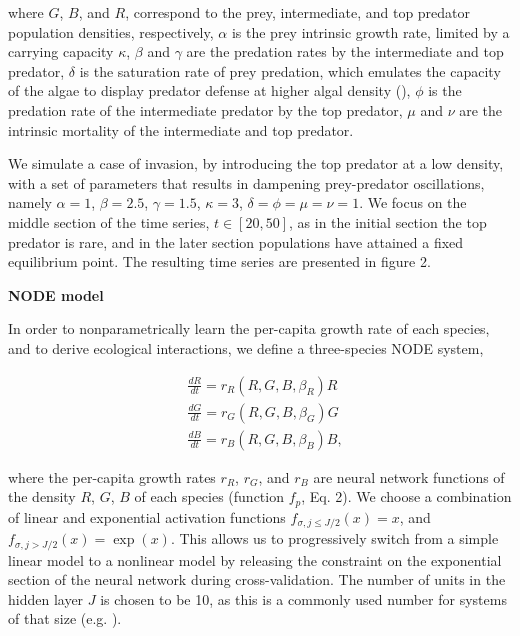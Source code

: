 \documentclass[11pt, oneside]{article}
\begin{document}
where $G$, $B$, and $R$, correspond to the prey, intermediate, and top predator population densities, respectively,
$\alpha$ is the prey intrinsic growth rate, limited by a carrying capacity $\kappa$, 
$\beta$ and $\gamma$ are the predation rates by the intermediate and top predator,
$\delta$ is the saturation rate of prey predation, which emulates the capacity of the algae to display predator defense at higher algal density (\cite{Hiltunen2013}),
$\phi$ is the predation rate of the intermediate predator by the top predator,
$\mu$ and $\nu$ are the intrinsic mortality of the intermediate and top predator.

We simulate a case of invasion, by introducing the top predator at a low density, with a set of parameters that results in dampening prey-predator oscillations, namely $\alpha = 1$, $\beta = 2.5$, $\gamma = 1.5$, $\kappa = 3$, $\delta = \phi = \mu = \nu = 1$.
We focus on the middle section of the time series, $t \in [20,50]$, as in the initial section the top predator is rare, and in the later section populations have attained a fixed equilibrium point.
The resulting time series are presented in figure 2.

\textbf{NODE model}

In order to nonparametrically learn the per-capita growth rate of each species, and to derive ecological interactions, we define a three-species NODE system,

\vspace{-0.5cm}
\begin{equation} \begin{aligned}
	& \frac{dR}{dt} = r_R(R,G,B,\beta_R) R \\
	& \frac{dG}{dt} = r_G(R,G,B,\beta_G) G \\
	& \frac{dB}{dt} = r_B(R,G,B,\beta_B) B,
\end{aligned} \end{equation}

where the per-capita growth rates $r_R$, $r_G$, and $r_B$ are neural network functions of the density $R$, $G$, $B$ of each species (function $f_p$, Eq. 2).
We choose a combination of linear and exponential activation functions $f_{\sigma, j\leq J/2}(x) = x$, and $f_{\sigma, j>J/2}(x) = \exp(x)$.
This allows us to progressively switch from a simple linear model to a nonlinear model by releasing the constraint on the exponential section of the neural network during cross-validation.
The number of units in the hidden layer $J$ is chosen to be 10, as this is a commonly used number for systems of that size (e.g. \cite{Wu2005,Bonnaffe2021a}). 
\end{document}
